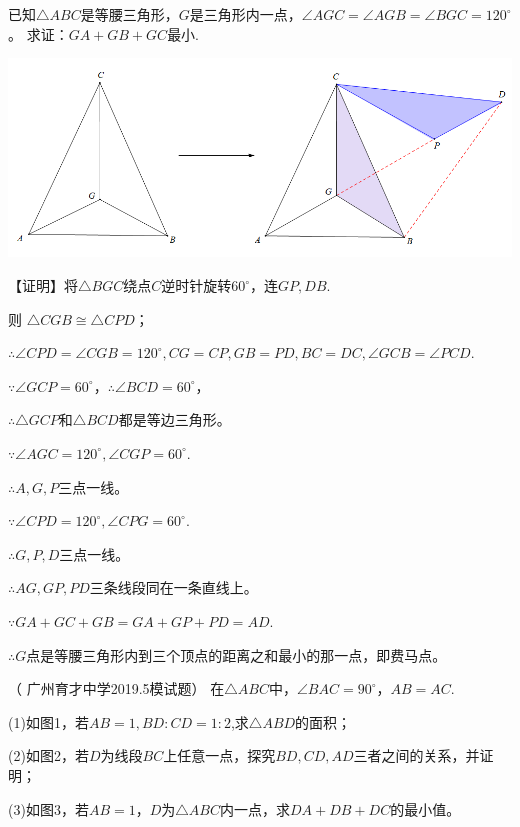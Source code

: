 \documentclass[10pt]{ctexart}
\begin{document}
\begin{shaded}
	\begin{example}
	已知$\triangle ABC$是等腰三角形，$G$是三角形内一点，$\angle AGC=\angle AGB=\angle BGC=120^\circ$。 求证：$GA+GB+GC$最小.	
	\end{example}
\end{shaded}

\begin{center}
	\includegraphics[scale=0.5]{figure/feimadian18}
\end{center}

{\kaishu\color{blue}【证明】将$\triangle BGC$绕点$C$逆时针旋转$60^\circ$，连$GP,DB$.

则 $\triangle CGB\cong \triangle CPD$；   

$\therefore \angle CPD=\angle CGB=120^\circ,CG=CP,GB=PD, BC=DC,\angle GCB=\angle PCD$.

$\because \angle GCP=60^\circ$，$\therefore  \angle BCD=60^\circ$，

$\therefore  \triangle GCP$和$\triangle BCD$都是等边三角形。

$\because \angle AGC=120^\circ, \angle CGP=60^\circ$.

$\therefore  A,G,P$三点一线。

$\because  \angle CPD=120^\circ, \angle CPG=60^\circ$.

$\therefore   G,P,D$三点一线。

$\therefore  AG,GP,PD$三条线段同在一条直线上。

$\because GA+GC+GB=GA+GP+PD=AD$.

$\therefore G$点是等腰三角形内到三个顶点的距离之和最小的那一点，即费马点。
}

\begin{shaded}
	\begin{example}（ 广州育才中学2019.5模试题）
	在$\triangle ABC$中，$\angle BAC=90^\circ$，$AB=AC$.
	
	(1)如图1，若$AB=1,BD: CD=1:2$,求$\triangle ABD$的面积；
	
	(2)如图2，若$D$为线段$BC$上任意一点，探究$BD,CD,AD$三者之间的关系，并证明；
	
	(3)如图3，若$AB=1$，$D$为$\triangle ABC$内一点，求$DA+DB+DC$的最小值。
	\end{example}
\end{shaded}
\end{document}
